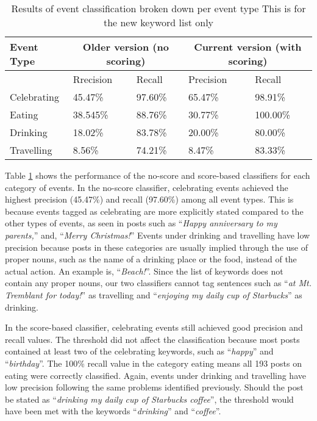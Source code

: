 \begin{table}[ph!]   %
	\centering
	\caption{Results of event classification broken down per event type This is for the new keyword list only} \vspace{0.25em}
	\begin{tabular}{|p{1in}|p{1in}|p{1in}|p{1in}|p{1in}|} \hline
		\centering Event Type & \multicolumn{2}{|c|}{Older version (no scoring)} &\multicolumn{2}{|c|}{Current version (with scoring)} \\ \cline{2-2}\hline
		& Rrecision & Recall & Precision &Recall\\\hline
		Celebrating & 45.47\% & 97.60\% & 65.47\% & 98.91\% \\ \hline
		Eating & 38.545\% & 88.76\% & 30.77\% & 100.00\% \\ \hline
		Drinking & 18.02\% & 83.78\%  & 20.00\% & 80.00\% \\ \hline
		Travelling & 8.56\% & 74.21\%  & 8.47\% & 83.33\% \\ \hline
	\end{tabular}
	\label{tab:eventclassification-results2}
\end{table}

Table \ref{tab:eventclassification-results2} shows the performance of the no-score and score-based classifiers for each category of events. In the no-score classifier, celebrating events achieved the highest precision (45.47\%) and recall (97.60\%) among all event types. This is because events tagged as celebrating are more explicitly stated compared to the other types of events, as seen in posts such as ``\textit{Happy anniversary to my parents,}'' and, ``\textit{Merry Christmas!}'' Events under drinking and travelling have low precision because posts in these categories are usually implied through the use of proper nouns, such as the name of a drinking place or the food, instead of the actual action. An example is, ``\textit{Beach!}''. Since the list of keywords does not contain any proper nouns, our two classifiers cannot tag sentences such as ``\textit{at Mt. Tremblant for today!}'' as travelling and ``\textit{enjoying my daily cup of Starbucks}'' as drinking. 

In the score-based classifier, celebrating events still achieved good precision and recall values. The threshold did not affect the classification because most posts contained at least two of the celebrating keywords, such as ``\textit{happy}'' and ``\textit{birthday}''. The 100\% recall value in the category eating means all 193 posts on eating were correctly classified. Again, events under drinking and travelling have low precision following the same problems identified previously. Should the post be stated as ``\textit{drinking my daily cup of Starbucks coffee}'', the threshold would have been met with the keywords ``\textit{drinking}'' and ``\textit{coffee}''. 


